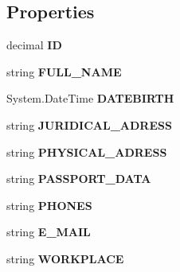 \subsection*{Properties}
\begin{CompactItemize}
\item 
decimal \textbf{ID}\hspace{0.3cm}{\tt  [get, set]}\label{class_automatic_medical_system_1_1_data_set2_1_1_p_a_t_i_e_n_t_s_row_0645ab3ab7c200456ba4ffd7a3ade9c2}

\item 
string \textbf{FULL\_\-NAME}\hspace{0.3cm}{\tt  [get, set]}\label{class_automatic_medical_system_1_1_data_set2_1_1_p_a_t_i_e_n_t_s_row_e20d1987182e2d2d80e44a24e19f7a78}

\item 
System.DateTime \textbf{DATEBIRTH}\hspace{0.3cm}{\tt  [get, set]}\label{class_automatic_medical_system_1_1_data_set2_1_1_p_a_t_i_e_n_t_s_row_ef5de11e064b5ff2105c92d7e8270208}

\item 
string \textbf{JURIDICAL\_\-ADRESS}\hspace{0.3cm}{\tt  [get, set]}\label{class_automatic_medical_system_1_1_data_set2_1_1_p_a_t_i_e_n_t_s_row_631e63de0611486190681e1906192aa6}

\item 
string \textbf{PHYSICAL\_\-ADRESS}\hspace{0.3cm}{\tt  [get, set]}\label{class_automatic_medical_system_1_1_data_set2_1_1_p_a_t_i_e_n_t_s_row_2d722aa7b3b97da1e8e1c27a50632e84}

\item 
string \textbf{PASSPORT\_\-DATA}\hspace{0.3cm}{\tt  [get, set]}\label{class_automatic_medical_system_1_1_data_set2_1_1_p_a_t_i_e_n_t_s_row_aa3442eef9a2a5bd38b56580e93299ff}

\item 
string \textbf{PHONES}\hspace{0.3cm}{\tt  [get, set]}\label{class_automatic_medical_system_1_1_data_set2_1_1_p_a_t_i_e_n_t_s_row_e67eda5b2d68100494918f6b3d8514b2}

\item 
string \textbf{E\_\-MAIL}\hspace{0.3cm}{\tt  [get, set]}\label{class_automatic_medical_system_1_1_data_set2_1_1_p_a_t_i_e_n_t_s_row_2dba621e1ebb75c964921360040456f7}

\item 
string \textbf{WORKPLACE}\hspace{0.3cm}{\tt  [get, set]}\label{class_automatic_medical_system_1_1_data_set2_1_1_p_a_t_i_e_n_t_s_row_ee4e842ae7c559106e48939a8c002161}

\end{CompactItemize}


